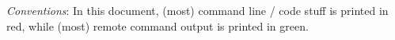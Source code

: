 

{\em Conventions}: In this document, (most) command line / code stuff is {\color{DarkRed} printed in red},
while (most) remote command output is {\color{DarkGreen} printed in green}.



